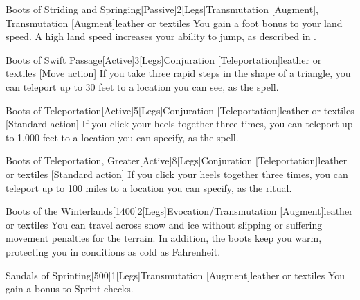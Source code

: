 \begin{magicitemdef}{Boots of Striding and Springing}[Passive]{2}[Legs]{Transmutation [Augment], Transmutation [Augment]}{leather or textiles}
     You gain a  foot bonus to your land speed.
    A high land speed increases your ability to jump, as described in .
\end{magicitemdef}

\begin{magicitemdef}{Boots of Swift Passage}[Active]{3}[Legs]{Conjuration [Teleportation]}{leather or textiles}
    [Move action] If you take three rapid steps in the shape of a triangle, you can teleport up to 30 feet to a location you can see, as the  spell.
\end{magicitemdef}

\begin{magicitemdef}{Boots of Teleportation}[Active]{5}[Legs]{Conjuration [Teleportation]}{leather or textiles}
    [Standard action] If you click your heels together three times, you can teleport up to 1,000 feet to a location you can specify, as the  spell.
\end{magicitemdef}

\begin{magicitemdef}{Boots of Teleportation, Greater}[Active]{8}[Legs]{Conjuration [Teleportation]}{leather or textiles}
    [Standard action] If you click your heels together three times, you can teleport up to 100 miles to a location you can specify, as the  ritual.
\end{magicitemdef}

\begin{magicitemdef}{Boots of the Winterlands}[1400]{2}[Legs]{Evocation/Transmutation [Augment]}{leather or textiles}
     You can travel across snow and ice without slipping or suffering movement penalties for the terrain.
    In addition, the boots keep you warm, protecting you in conditions as cold as  Fahrenheit.
\end{magicitemdef}

\begin{magicitemdef}{Sandals of Sprinting}[500]{1}[Legs]{Transmutation [Augment]}{leather or textiles}
     You gain a  bonus to Sprint checks.
\end{magicitemdef}

